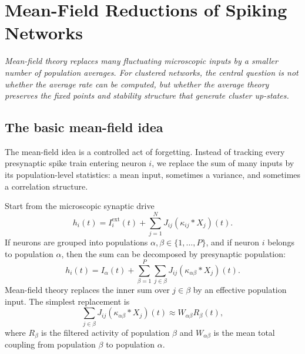 \chapter{Mean-Field Reductions of Spiking Networks}
\label{ch:mean-field-reductions}

\textit{Mean-field theory replaces many fluctuating microscopic inputs by a smaller number of population averages. For clustered networks, the central question is not whether the average rate can be computed, but whether the average theory preserves the fixed points and stability structure that generate cluster up-states.}

\section{The basic mean-field idea}
\label{sec:basic-mean-field-idea}

The mean-field idea is a controlled act of forgetting. Instead of tracking every presynaptic spike train entering neuron $i$, we replace the sum of many inputs by its population-level statistics: a mean input, sometimes a variance, and sometimes a correlation structure.

Start from the microscopic synaptic drive
%
\begin{equation}
  h_i(t)
  =
  I_i^{\mathrm{ext}}(t)
  +
  \sum_{j=1}^N J_{ij}(\kappa_{ij}*X_j)(t).
  \label{eq:mf-microscopic-drive}
\end{equation}
%
If neurons are grouped into populations $\alpha,\beta\in\{1,\ldots,P\}$, and if neuron $i$ belongs to population $\alpha$, then the sum can be decomposed by presynaptic population:
%
\begin{equation}
  h_i(t)
  =
  I_\alpha(t)
  +
  \sum_{\beta=1}^P
  \sum_{j\in\beta}
  J_{ij}(\kappa_{\alpha\beta}*X_j)(t).
  \label{eq:mf-population-decomposition}
\end{equation}
%
Mean-field theory replaces the inner sum over $j\in\beta$ by an effective population input. The simplest replacement is
%
\begin{equation}
  \sum_{j\in\beta}
  J_{ij}(\kappa_{\alpha\beta}*X_j)(t)
  \approx
  W_{\alpha\beta} R_\beta(t),
  \label{eq:mf-replacement}
\end{equation}
%
where $R_\beta$ is the filtered activity of population $\beta$ and $W_{\alpha\beta}$ is the mean total coupling from population $\beta$ to population $\alpha$.

